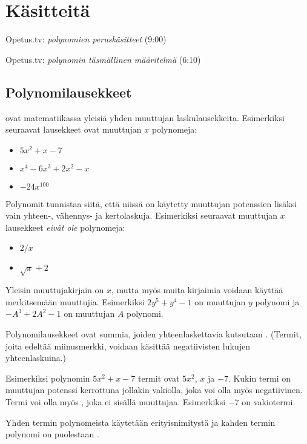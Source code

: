 \section{Käsitteitä}

{Opetus.tv: \emph{polynomien peruskäsitteet} (9:00)}

{Opetus.tv: \emph{polynomin täsmällinen määritelmä} (6:10)}

\subsection*{Polynomilausekkeet}

 ovat matematiikassa yleisiä yhden muuttujan laskulausekkeita.
Esimerkiksi seuraavat lausekkeet ovat muuttujan $x$ polynomeja:
\begin{itemize}
\item $5x^2+x-7$
\item $x^4-6x^3+2x^2-x$
\item $-24x^{100}$
\end{itemize}
Polynomit tunnistaa siitä, että niissä on käytetty muuttujan potenssien lisäksi vain yhteen-, vähennys- ja kertolaskuja. Esimerkiksi seuraavat muuttujan $x$ lausekkeet \emph{eivät ole} polynomeja:
\begin{itemize}
\item $2/x$
\item $\sqrt{x}+2$
\end{itemize}
Yleisin muuttujakirjain on $x$, mutta myös muita kirjaimia voidaan käyttää
merkitsemään muuttujia. Esimerkiksi $2y^5+y^4-1$ on muuttujan $y$ polynomi ja
$-A^3+2A^2-1$ on muuttujan $A$ polynomi.

Polynomilausekkeet ovat summia, joiden yhteenlaskettavia kutsutaan . (Termit, joita edeltää miinusmerkki, voidaan käsittää negatiivisten lukujen yhteenlaskuina.)

Esimerkiksi polynomin $5x^2+x-7$ termit ovat $5x^2$, $x$ ja $-7$. Kukin termi on muuttujan potenssi kerrottuna jollakin vakiolla, joka voi olla myös negatiivinen. Termi voi olla myös , joka ei sisällä muuttujaa. Esimerkiksi $-7$ on vakiotermi.

Yhden termin polynomeista käytetään erityisnimitystä 
ja kahden termin polynomi on puolestaan .

